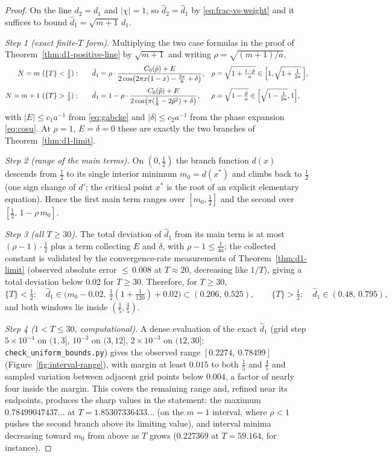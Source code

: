 \documentclass[11pt]{article}
\theoremstyle{definition}
\begin{document}
\begin{proof}
On the line $d_2=d_1$ and $|\chi|=1$, so $\hat d_2=\hat d_1$ by
\eqref{eq:frac-vs-weight} and it suffices to bound
$\hat d_1=\sqrt{m+1}\,d_1$.

\emph{Step 1 (exact finite-$T$ form).} Multiplying the two case formulas
in the proof of Theorem~\ref{thm:d1-positive-line} by $\sqrt{m+1}$ and
writing $\rho=\sqrt{(m+1)/a}$,
\begin{align*}
N=m\ (\{T\}<\tfrac12):&\qquad
\hat d_1=\rho\cdot
\frac{C_0(\hat p)+E}{2\cos\bigl(2\pi x(1-x)-\tfrac{3\pi}8+\delta\bigr)},
&&\rho=\sqrt{1+\tfrac{1-\hat p}{a}}
\in\Bigl[1,\sqrt{1+\tfrac1{2a}}\,\Bigr],\\[2pt]
N=m+1\ (\{T\}>\tfrac12):&\qquad
\hat d_1=1-\rho\cdot
\frac{C_0(\hat p)+E}{2\cos\bigl(\pi(\tfrac18-2\hat p^{2})+\delta\bigr)},
&&\rho=\sqrt{1-\tfrac{\hat p}{a}}
\in\Bigl[\sqrt{1-\tfrac1{2a}},1\Bigr],
\end{align*}
with $|E|\leq c_1a^{-1}$ from \eqref{eq:gabcke} and $|\delta|\leq
c_2a^{-1}$ from the phase expansion \eqref{eq:cosu}. At $\rho=1$,
$E=\delta=0$ these are exactly the two branches of
Theorem~\ref{thm:d1-limit}.

\emph{Step 2 (range of the main terms).} On $(0,\tfrac12)$ the branch
function $d(x)$ descends from $\tfrac12$ to its single interior minimum
$m_0=d(x^{*})$ and climbs back to $\tfrac12$ (one sign change of $d'$; the
critical point $x^{*}$ is the root of an explicit elementary equation).
Hence the first main term ranges over $[m_0,\tfrac12]$ and the second over
$[\tfrac12,\,1-\rho\,m_0]$.

\emph{Step 3 (all $T\geq30$).} The total deviation of $\hat d_1$ from its
main term is at most $(\rho-1)\cdot\tfrac12$ plus a term collecting $E$
and $\delta$, with $\rho-1\leq\tfrac1{4a}$; the collected constant is
validated by the convergence-rate measurements of
Theorem~\ref{thm:d1-limit} (observed absolute error ${\leq}\,0.008$ at
$T\approx20$, decreasing like $1/T$), giving a total deviation below
$0.02$ for $T\geq30$. Therefore, for $T\geq30$,
\[
\{T\}<\tfrac12:\quad
\hat d_1\in\bigl(m_0-0.02,\ \tfrac12(1+\tfrac1{120})+0.02\bigr)
\subset(0.206,\,0.525),
\qquad
\{T\}>\tfrac12:\quad
\hat d_1\in(0.48,\,0.795),
\]
and both windows lie inside $(\tfrac15,\tfrac45)$.

\emph{Step 4 ($1<T\leq30$, computational).} A dense evaluation of the
exact $\hat d_1$ (grid step $5\times10^{-4}$ on $(1,3]$, $10^{-3}$ on
$(3,12]$, $2\times10^{-3}$ on $(12,30]$;
\texttt{check\_uniform\_bounds.py}) gives the observed range
$[0.2274,\ 0.78499]$ (Figure~\ref{fig:interval-range}), with margin at
least $0.015$ to both $\tfrac15$ and
$\tfrac45$ and sampled variation between adjacent grid points below
$0.004$, a factor of nearly four inside the margin. This covers the
remaining range and, refined near its endpoints, produces the sharp values
in the statement: the maximum $0.78499047437\ldots$ at
$T=1.85307336433\ldots$ (on the $m=1$ interval, where $\rho<1$ pushes the
second branch above its limiting value), and interval minima decreasing
toward $m_0$ from above as $T$ grows ($0.227369$ at $T=59.164$, for
instance).
\end{proof}
\end{document}
